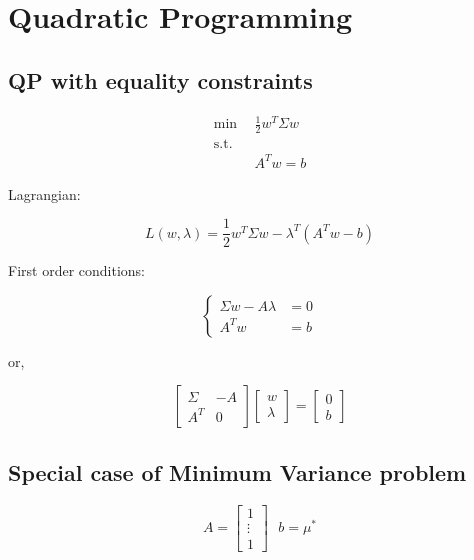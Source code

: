 \documentclass[
  11pt,
]{article}
\begin{document}
\hypertarget{quadratic-programming}{%
\section{Quadratic Programming}\label{quadratic-programming}}

\hypertarget{qp-with-equality-constraints}{%
\subsection{QP with equality
constraints}\label{qp-with-equality-constraints}}

\[
\begin{aligned}
    \mbox{min} \ \ & \frac{1}{2} w^T \Sigma w  \\
    \mbox{s.t.} & \\
    & A^T w  = b
  \end{aligned}
\]

Lagrangian:

\[
L(w, \lambda) = \frac{1}{2} w^T \Sigma w - \lambda^T \left(A^Tw -b \right)
\]

First order conditions:

\[
\left\{
                \begin{aligned}
                \Sigma w - A \lambda &= 0 \\
                A^Tw & = b
                \end{aligned}
              \right.
\]

or,

\[
\begin{bmatrix} \Sigma & -A \\ A^T & 0 \end{bmatrix}  \left[ \begin{array}{c} w \\ \lambda \end{array} \right] = \left[ \begin{array}{c} 0 \\ b \end{array} \right] 
\]

\hypertarget{special-case-of-minimum-variance-problem}{%
\subsection{Special case of Minimum Variance
problem}\label{special-case-of-minimum-variance-problem}}

\[
A = \begin{bmatrix} 1  \\ \vdots  \\ 1\end{bmatrix} \ \ \ b = \mu^*
\]
\end{document}
